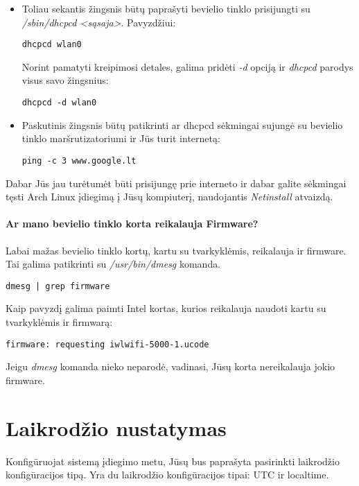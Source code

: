 \begin{itemize}
\begin{verbatim}
\end{verbatim}
    \item Toliau sekantis žingsnis būtų paprašyti bevielio tinklo
      prisijungti su \textsl{/sbin/dhcpcd <sąsaja>}. Pavyzdžiui:
\begin{verbatim}
dhcpcd wlan0
\end{verbatim}
      Norint pamatyti kreipimosi detales, galima pridėti \textsl{-d}
      opciją ir \textsl{dhcpcd} parodys visus savo žingsnius:
\begin{verbatim}
dhcpcd -d wlan0
\end{verbatim}
    \item Paskutinis žingsnis būtų patikrinti ar dhcpcd sėkmingai
      sujungė su bevielio tinklo maršrutizatoriumi ir Jūs turit
      internetą:
\begin{verbatim}
ping -c 3 www.google.lt
\end{verbatim}
      
  \end{itemize}

Dabar Jūs jau turėtumėt būti prisijungę prie interneto ir dabar galite
sėkmingai tęsti Arch Linux įdiegimą į Jūsų kompiuterį, naudojantis
\textsl{Netinstall } atvaizdą.

\paragraph{Ar mano bevielio tinklo korta reikalauja Firmware?}

Labai mažas bevielio tinklo kortų, kartu su tvarkyklėmis, reikalauja
ir firmware. Tai galima patikrinti su \textsl{/usr/bin/dmesg}
komanda. 
\begin{verbatim}
dmesg | grep firmware
\end{verbatim}
Kaip pavyzdį galima paimti Intel kortas, kurios reikalauja naudoti
kartu su tvarkyklėmis ir firmwarą:
\begin{verbatim}
firmware: requesting iwlwifi-5000-1.ucode
\end{verbatim}
Jeigu \textsl{dmesg} komanda nieko neparodė, vadinasi, Jūsų korta
nereikalauja jokio firmware.

\section{Laikrodžio nustatymas}

Konfigūruojat sistemą įdiegimo metu, Jūsų bus paprašyta pasirinkti
laikrodžio konfigūracijos tipą. Yra du laikrodžio konfigūracijos
tipai: UTC ir localtime.

